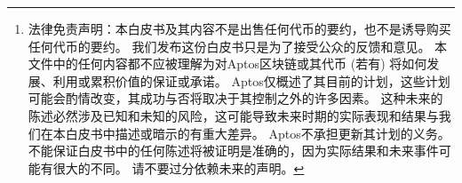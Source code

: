 \documentclass{article}
\begin{document}
\begin{abstract}
随着全新的互联网基础设施区块链的崛起，开发者正以飞快的速度部署着数以万计的去中心化应用程序。遗憾的是，由于稳定性差、成本高、低吞吐量及一些安全问题，区块链尚未被广泛应用。 为了能够在web3时代被广泛使用，区块链基础设施应该效仿云基础设施的特点，即为众多的去中心化应用提供可信，可扩展，经济高效且持续优化的平台。

为应对这些挑战，我们以可扩展、安全、可靠和可升级为核心设计原则推出\emph{Aptos 区块链}。 Aptos 区块链是在过去三年中由全球350多名开发人员开发的 \cite{aptos_core_github}。 它在共识算法、智能合约设计、系统安全、性能和去中心化方面提供了新的创新。 这些技术的结合将为把Web3带向更广泛的人群提供一个坚实的基础：
\footnote{法律免责声明：本白皮书及其内容不是出售任何代币的要约，也不是诱导购买任何代币的要约。 我们发布这份白皮书只是为了接受公众的反馈和意见。 本文件中的任何内容都不应被理解为对Aptos区块链或其代币 (若有) 将如何发展、利用或累积价值的保证或承诺。 Aptos仅概述了其目前的计划，这些计划可能会酌情改变，其成功与否将取决于其控制之外的许多因素。 这种未来的陈述必然涉及已知和未知的风险，这可能导致未来时期的实际表现和结果与我们在本白皮书中描述或暗示的有重大差异。 Aptos不承担更新其计划的义务。 不能保证白皮书中的任何陈述将被证明是准确的，因为实际结果和未来事件可能有很大的不同。 请不要过分依赖未来的声明。}
 
 \begin{itemize}
  \item 首先，Aptos 区块链原生集成并使用 \emph{Move 语言}来实现快速安全的交易执行 \cite{move_github}。 \emph{Move prover}，一个用Move 语言开发的智能合约形式化验证工具，为合约常量和运行提供额外保障。 这种注重安全的做法，可以让开发人员能够更好地保护软件，以免受恶意实体的攻击。 
  \item 其次，Aptos 数据模型允许灵活的密钥管理和混合托管选项。 这与签名前的交易透明性和实用的轻客户端协议一起，共同提供了更安全、更值得信赖的用户体验。

  \item 第三，为了实现高吞吐量和低延迟，Aptos区块链在交易处理的关键阶段使用了流水线和模块化方法。 具体而言，交易分发、区块元数据排序、并行事务执行、批量存储和账本认证等操作会同时运行。 这种做法充分利用了所有可用的硬件资源，提升了硬件效率，并实现了高度并行处理。 

  \item 第四，与需要读写前获取被读写数据而破坏交易原子性的并行执行引擎不同，Aptos 区块链没有对开发者设置这种限制。它通过保证复杂的交易的原子性，为应用程序提供更高的吞吐量和更低的延迟，并简化了开发。

  \item 第五，Aptos模块化架构保证了客户端的灵活性，并针对频繁的升级进行优化。 此外，为了迅速部署新的技术创新和支持新的Web3使用案例，Aptos区块链提供了嵌入式的链上变化管理协议。

  \item 最后，Aptos区块链正在试验未来超越单个验证器性能的举措：其模块化设计和并行执行引擎支持验证者的内部分片，而同质状态分片（homogeneous state sharding）提供了水平吞吐量可扩展的潜力，而不会给节点运营商带来额外的复杂性。
\end{itemize}

\end{abstract}
\end{document}
